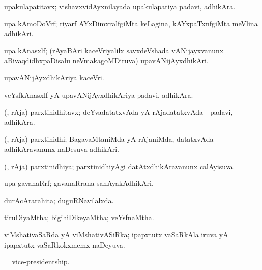 \bentry
{} 
\gl{\nA}
\expl{}
\bmng
 upakulapatitavx; vishavxvidAyxnilayada upakulapatiya padavi, adhikAra. 
\emng
\eentry

\bentry
{} 
\gl{\nA}
\expl{}
\bmng
 upa kAmoDoVrf; riyarf AYxDimxralfgiMta keLagina, kAYxpaTxnfgiMta meVlina adhikAri. 
\emng
\eentry

\bentry
{} 
\gl{\nA}
\expl{}
\bmng
 upa kAnasxlf; (rAyaBAri kaceVriyalilx savxdeVshada vANijayxvanunx aBivaqdidhxpaDisalu neVmakagoMDiruva) upavANijAyxdhikAri. 
\emng
\eentry

\bentry
{} 
\gl{\nA}
\expl{}
\bmng
 upavANijAyxdhikAriya kaceVri. 
\emng
\eentry

\bentry
{} 
\gl{\nA}
\expl{}
\bmng
 veYsfkAnasxlf yA upavANijAyxdhikAriya padavi, adhikAra. 
\emng
\eentry

\bentry
{} 
\gl{\nA}
\bmng
 (\deVva, rAja) parxtinidhitavx; deYvadatatxvAda yA rAjadatatxvAda - padavi, adhikAra. 
\emng
\eentry

\bentry
{} 
\gl{\nA}
\expl{}
\bmng
 (\deVva, rAja) parxtinidhi; BagavaMtaniMda yA rAjaniMda, datatxvAda adhikAravanunx naDesuva adhikAri. 
\emng
\eentry

\bentry
{} 
\gl{\gu}
\expl{}
\bmng
 (\deVva, rAja) parxtinidhiya; parxtinidhiyAgi datAtxdhikAravanunx calAyisuva. 
\emng
\eentry

\bentry
{} 
\gl{\nA}
\expl{}
\bmng
 upa gavanaRrf; gavanaRrana sahAyakAdhikAri. 
\emng
\eentry

\bentry
{} 
\gl{\gu}
\expl{}
\bmng
 durAcArarahita; duguRNavilalxda. 
\emng
\eentry

\bentry
{} 
\gl{\gu}
\expl{}
\bmng
 tiruDiyaMtha; bigihiDikeyaMtha; veYsfnaMtha. 
\emng
\eentry

\bentry
{} 
\gl{\gu}
\expl{}
\bmng
 viMshativaSaRda yA viMshativASiRka; ipapxtutx vaSaRkAla iruva yA ipapxtutx vaSaRkokxmemx naDeyuva. 
\emng
\eentry

\bentry
{} 
\gl{\nA}
\expl{}
\bmng
 = \hyperlink{vice-presidentship}{vice-presidentship}. 
\emng
\eentry


